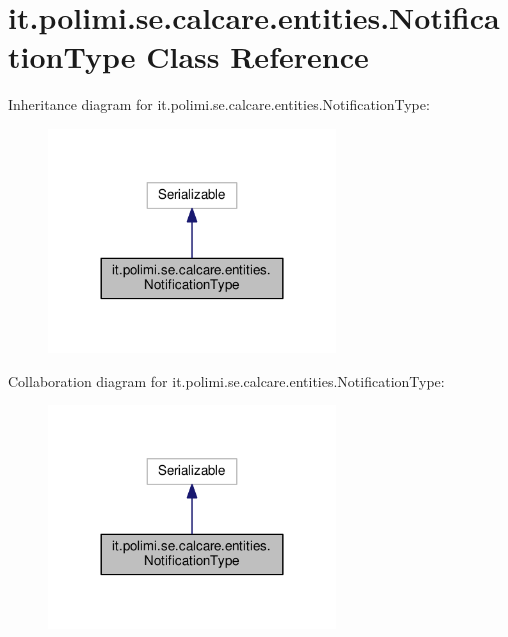 \hypertarget{classit_1_1polimi_1_1se_1_1calcare_1_1entities_1_1NotificationType}{}\section{it.\+polimi.\+se.\+calcare.\+entities.\+Notification\+Type Class Reference}
\label{classit_1_1polimi_1_1se_1_1calcare_1_1entities_1_1NotificationType}


Inheritance diagram for it.\+polimi.\+se.\+calcare.\+entities.\+Notification\+Type\+:
\nopagebreak
\begin{figure}[H]
\begin{center}
\leavevmode
\includegraphics[width=216pt]{classit_1_1polimi_1_1se_1_1calcare_1_1entities_1_1NotificationType__inherit__graph}
\end{center}
\end{figure}


Collaboration diagram for it.\+polimi.\+se.\+calcare.\+entities.\+Notification\+Type\+:
\nopagebreak
\begin{figure}[H]
\begin{center}
\leavevmode
\includegraphics[width=216pt]{classit_1_1polimi_1_1se_1_1calcare_1_1entities_1_1NotificationType__coll__graph}
\end{center}
\end{figure}
